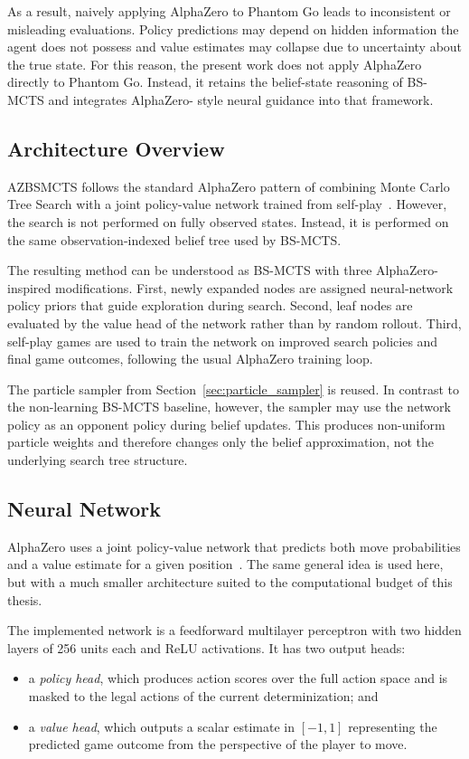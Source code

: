 \documentclass[12pt,oneside,openright]{article}
\begin{document}
As a result, naively applying AlphaZero to Phantom Go leads to inconsistent or misleading evaluations. Policy predictions may depend on hidden information the agent does not possess and value estimates may collapse due to uncertainty about the true state.
For this reason, the present work does not apply AlphaZero directly to Phantom Go.
Instead, it retains the belief-state reasoning of BS-MCTS and integrates AlphaZero-
style neural guidance into that framework.

\subsection{Architecture Overview}

AZBSMCTS follows the standard AlphaZero pattern of combining Monte Carlo Tree
Search with a joint policy-value network trained from self-play~\cite{Silver2017alphazero}.
However, the search is not performed on fully observed states. Instead, it is performed
on the same observation-indexed belief tree used by BS-MCTS.

The resulting method can be understood as BS-MCTS with three AlphaZero-inspired
modifications. First, newly expanded nodes are assigned neural-network policy priors
that guide exploration during search. Second, leaf nodes are evaluated by the value
head of the network rather than by random rollout. Third, self-play games are used to
train the network on improved search policies and final game outcomes, following the
usual AlphaZero training loop.

The particle sampler from Section~\ref{sec:particle_sampler} is reused. In contrast to the non-learning
BS-MCTS baseline, however, the sampler may use the network policy as an opponent
policy during belief updates. This produces non-uniform particle weights and therefore
changes only the belief approximation, not the underlying search tree structure.

\subsection{Neural Network}

AlphaZero uses a joint policy-value network that predicts both move probabilities and
a value estimate for a given position~\cite{Silver2017alphazero}. The same general
idea is used here, but with a much smaller architecture suited to the computational
budget of this thesis.

The implemented network is a feedforward multilayer perceptron with two hidden
layers of 256 units each and ReLU activations. It has two output heads:
\begin{itemize}
  \item a \textit{policy head}, which produces action scores over the full action space and
        is masked to the legal actions of the current determinization; and
  \item a \textit{value head}, which outputs a scalar estimate in $[-1,1]$ representing the
        predicted game outcome from the perspective of the player to move.
\end{itemize}
\end{document}
